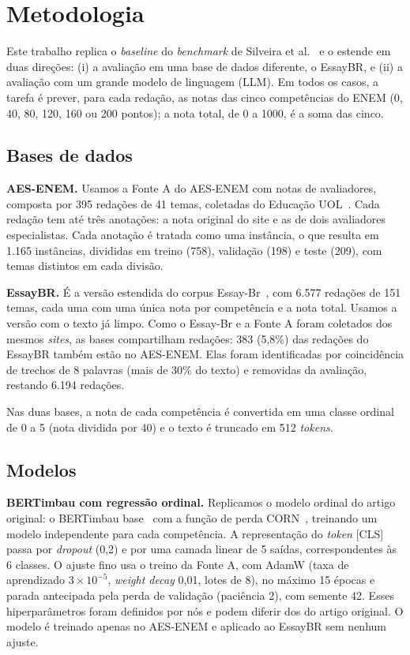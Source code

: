 \section{Metodologia}
\label{sec:metodologia}

Este trabalho replica o \textit{baseline} do \textit{benchmark} de Silveira et al.~\cite{silveira-etal-2024-new} e o estende em duas direções: (i) a avaliação em uma base de dados diferente, o EssayBR, e (ii) a avaliação com um grande modelo de linguagem (LLM). Em todos os casos, a tarefa é prever, para cada redação, as notas das cinco competências do ENEM (0, 40, 80, 120, 160 ou 200 pontos); a nota total, de 0 a 1000, é a soma das cinco.

\subsection{Bases de dados}

\textbf{AES-ENEM.} Usamos a Fonte A do AES-ENEM com notas de avaliadores, composta por 395 redações de 41 temas, coletadas do Educação UOL~\cite{silveira-etal-2024-new}. Cada redação tem até três anotações: a nota original do site e as de dois avaliadores especialistas. Cada anotação é tratada como uma instância, o que resulta em 1.165 instâncias, divididas em treino (758), validação (198) e teste (209), com temas distintos em cada divisão.

\textbf{EssayBR.} É a versão estendida do corpus Essay-Br~\cite{marinho2022essaybr}, com 6.577 redações de 151 temas, cada uma com uma única nota por competência e a nota total. Usamos a versão com o texto já limpo. Como o Essay-Br e a Fonte A foram coletados dos mesmos \textit{sites}, as bases compartilham redações: 383 (5,8\%) das redações do EssayBR também estão no AES-ENEM. Elas foram identificadas por coincidência de trechos de 8 palavras (mais de 30\% do texto) e removidas da avaliação, restando 6.194 redações.

Nas duas bases, a nota de cada competência é convertida em uma classe ordinal de 0 a 5 (nota dividida por 40) e o texto é truncado em 512 \textit{tokens}.

\subsection{Modelos}

\textbf{BERTimbau com regressão ordinal.} Replicamos o modelo ordinal do artigo original: o BERTimbau base~\cite{souza2020bertimbau} com a função de perda CORN~\cite{shi2021corn}, treinando um modelo independente para cada competência. A representação do \textit{token} [CLS] passa por \textit{dropout} (0,2) e por uma camada linear de 5 saídas, correspondentes às 6 classes. O ajuste fino usa o treino da Fonte A, com AdamW (taxa de aprendizado $3\times10^{-5}$, \textit{weight decay} 0,01, lotes de 8), no máximo 15 épocas e parada antecipada pela perda de validação (paciência 2), com semente 42. Esses hiperparâmetros foram definidos por nós e podem diferir dos do artigo original. O modelo é treinado apenas no AES-ENEM e aplicado ao EssayBR sem nenhum ajuste.

